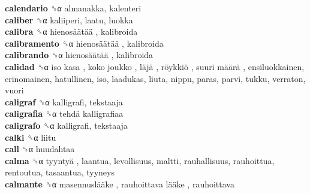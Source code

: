 \textbf{calendario} ␝α  almanakka, kalenteri  \\
\textbf{caliber} ␝α  kaliiperi, laatu, luokka  \\
\textbf{calibra} ␝α   hienosäätää , kalibroida  \\
\textbf{calibramento} ␝α   hienosäätää , kalibroida  \\
\textbf{calibrando} ␝α   hienosäätää , kalibroida  \\
\textbf{calidad} ␝α   iso kasa ,  koko joukko ,  läjä ,  röykkiö ,  suuri määrä , ensiluokkainen, erinomainen, hatullinen, iso, laadukas, liuta, nippu, paras, parvi, tukku, verraton, vuori  \\
\textbf{caligraf} ␝α  kalligrafi, tekstaaja  \\
\textbf{caligrafia} ␝α   tehdä kalligrafiaa   \\
\textbf{caligrafo} ␝α  kalligrafi, tekstaaja  \\
\textbf{calki} ␝α  liitu  \\
\textbf{call} ␝α  huudahtaa  \\
\textbf{calma} ␝α   tyyntyä , laantua, levollisuus, maltti, rauhallisuus, rauhoittua, rentoutua, tasaantua, tyyneys  \\
\textbf{calmante} ␝α   masennuslääke ,  rauhoittava lääke , rauhoittava  \\
